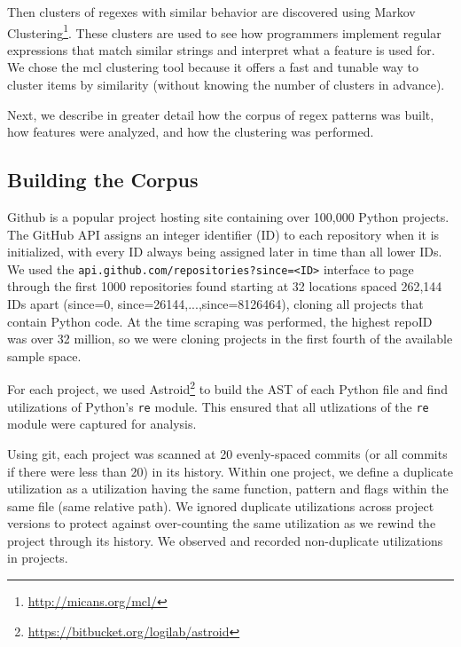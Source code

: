 Then clusters of regexes with similar behavior are discovered using Markov Clustering\footnote{\url{http://micans.org/mcl/}}.  These clusters are used to see how programmers implement regular expressions that match similar strings and interpret what a feature is used for.
 We chose the mcl clustering tool because it offers a fast and tunable way to cluster items by similarity (without knowing the number of clusters in advance).


Next, we describe in greater detail how the corpus of regex patterns was built, how features were analyzed, and how the clustering was performed.




\subsection{Building the Corpus}
\label{study:corpus}
Github is a popular project hosting site containing over 100,000 Python projects.
The GitHub API assigns an integer identifier (ID) to each repository when it is initialized, with every ID always being assigned later in time than all lower IDs.  We used the {\tt api.github.com/repositories?since=<ID>} interface to page through the first 1000 repositories found starting at 32 locations spaced 262,144 IDs apart (since=0, since=26144,...,since=8126464), cloning all projects that contain Python code.  At the time scraping was performed, the highest repoID was over 32 million, so we were cloning projects in the first fourth of the available sample space.

For each project, we used Astroid\footnote{\url{https://bitbucket.org/logilab/astroid}} to build the AST of each Python file and find utilizations of Python's {\tt re} module. This ensured that all utlizations of the {\tt re} module were captured for analysis.

Using git, each project was scanned at 20 evenly-spaced commits (or all commits if there were less than 20) in its history.
Within one project, we define a duplicate utilization as a utilization having the same function, pattern and flags within the same file (same relative path).  We ignored duplicate utilizations across project versions to protect against over-counting the same utilization as we rewind the project through its history.  We observed and recorded  non-duplicate utilizations in  projects.


